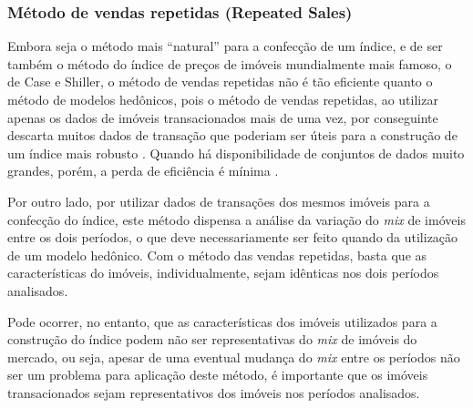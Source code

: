 \documentclass[
	12pt,				%
	oneside,			%
	a4paper,			%
	chapter=TITLE,		%
	section=TITLE,		%
	english,			%
	brazil				%
	]{abntex2}
\begin{document}
\begin{refsection}
\hypertarget{muxe9todo-de-vendas-repetidas-repeated-sales}{%
\subsubsection{Método de vendas repetidas (Repeated Sales)}\label{muxe9todo-de-vendas-repetidas-repeated-sales}}

Embora seja o método mais ``natural'' para a confecção de um índice, e de ser
também o método do índice de preços de imóveis mundialmente mais famoso, o de
Case e Shiller, o método de vendas repetidas não é tão eficiente quanto o método
de modelos hedônicos, pois o método de vendas repetidas, ao utilizar apenas os
dados de imóveis transacionados mais de uma vez, por conseguinte descarta muitos
dados de transação que poderiam ser úteis para a construção de um índice mais
robusto \autocite[160]{rppi}. Quando há disponibilidade de conjuntos de dados muito
grandes, porém, a perda de eficiência é mínima \autocite{Case1989}.

Por outro lado, por utilizar dados de transações dos mesmos imóveis para a
confecção do índice, este método dispensa a análise da variação do \emph{mix} de
imóveis entre os dois períodos, o que deve necessariamente ser feito quando da
utilização de um modelo hedônico. Com o método das vendas repetidas, basta que
as características do imóveis, individualmente, sejam idênticas nos dois
períodos analisados.

Pode ocorrer, no entanto, que as características dos imóveis utilizados para a
construção do índice podem não ser representativas do \emph{mix} de imóveis do
mercado, ou seja, apesar de uma eventual mudança do \emph{mix} entre os períodos não
ser um problema para aplicação deste método, é importante que os imóveis
transacionados sejam representativos dos imóveis nos períodos analisados.


\end{refsection}
\end{document}
